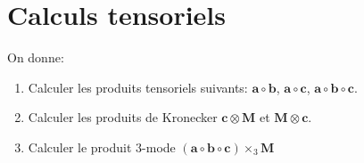 \section{Calculs tensoriels}
On donne:
\begin{enumerate}
	\item Calculer les produits tensoriels suivants: $\bm{a} \circ \bm{b}$,\; $\bm{a} \circ \bm{c}$,\; $\bm{a} \circ \bm{b} \circ \bm{c}$.
	\item Calculer les produits de Kronecker $\bm{c} \otimes \bm{M}$ et $\bm{M} \otimes \bm{c}$.
	\item Calculer le produit $3$-mode $(\bm{a} \circ \bm{b} \circ \bm{c}) \times_3 \bm{M}$
\end{enumerate}